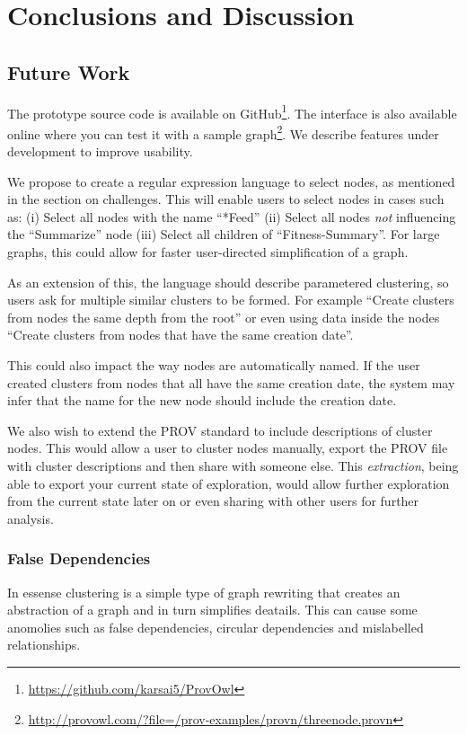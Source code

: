 \chapter{Conclusions and Discussion} %
\section{Future Work}
The prototype source code is available on GitHub\footnote{\url{https://github.com/karsai5/ProvOwl}}. The interface is also available online where you can test it with a sample graph\footnote{\url{http://provowl.com/?file=/prov-examples/provn/threenode.provn}}.
We describe features under development to improve usability.

We propose to create a regular expression language to select nodes, as mentioned in the section on challenges. 
This will enable users to select nodes in cases such as:
(i) Select all nodes with the name ``*Feed''
(ii) Select all nodes \textit{not} influencing the ``Summarize'' node
(iii) Select all children of ``Fitness-Summary''.
For large graphs, this could allow for faster user-directed simplification of a graph. 

As an extension of this, the language should describe parametered clustering, so users ask for multiple similar clusters to be formed. For example ``Create clusters from nodes the same depth from the root'' or even using data inside the nodes ``Create clusters from nodes that have the same creation date''.  

This could also impact the way nodes are automatically named. If the user created clusters from nodes that all have the same creation date, the system may infer that the name for the new node should include the creation date.

We also wish to extend the PROV standard to include descriptions of cluster nodes. This would allow a user to cluster nodes manually, export the PROV file with cluster descriptions and then share with someone else. This \textit{extraction}, being able to export your current state of exploration, would allow further exploration from the current state later on or even sharing with other users for further analysis.

\subsection{False Dependencies}
\label{sec:section_name}

In essense clustering is a simple type of graph rewriting that creates an abstraction of a graph and in turn simplifies deatails. This can cause some anomolies such as false dependencies, circular dependencies and mislabelled relationships. 

